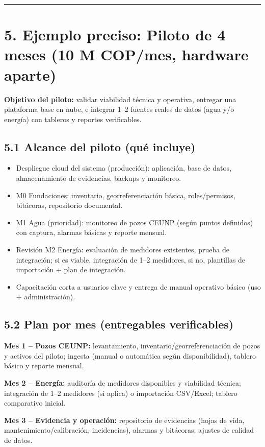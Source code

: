 \documentclass[11pt]{article}
\begin{document}
\vspace{0.2em}
\hrule
\vspace{0.6em}

\section*{5. Ejemplo preciso: Piloto de 4 meses (10 M COP/mes, hardware aparte)}
\textbf{Objetivo del piloto:} validar viabilidad técnica y operativa, entregar una plataforma base en nube, e integrar 1--2 fuentes reales de datos (agua y/o energía) con tableros y reportes verificables.

\subsection*{5.1 Alcance del piloto (qué incluye)}
\begin{itemize}
  \item Despliegue cloud del sistema (producción): aplicación, base de datos, almacenamiento de evidencias, backups y monitoreo.
  \item M0 Fundaciones: inventario, georreferenciación básica, roles/permisos, bitácoras, repositorio documental.
  \item M1 Agua (prioridad): monitoreo de pozos CEUNP (según puntos definidos) con captura, alarmas básicas y reporte mensual.
  \item Revisión M2 Energía: evaluación de medidores existentes, prueba de integración; si es viable, integración de 1--2 medidores, si no, plantillas de importación + plan de integración.
  \item Capacitación corta a usuarios clave y entrega de manual operativo básico (uso + administración).
\end{itemize}

\subsection*{5.2 Plan por mes (entregables verificables)}
\textbf{Mes 1 -- Pozos CEUNP:} levantamiento, inventario/georreferenciación de pozos y activos del piloto; ingesta (manual o automática según disponibilidad), tablero básico y reporte mensual.

\textbf{Mes 2 -- Energía:} auditoría de medidores disponibles y viabilidad técnica; integración de 1--2 medidores (si aplica) o importación CSV/Excel; tablero comparativo inicial.

\textbf{Mes 3 -- Evidencia y operación:} repositorio de evidencias (hojas de vida, mantenimiento/calibración, incidencias), alarmas y bitácoras; ajustes de calidad de datos.
\end{document}
